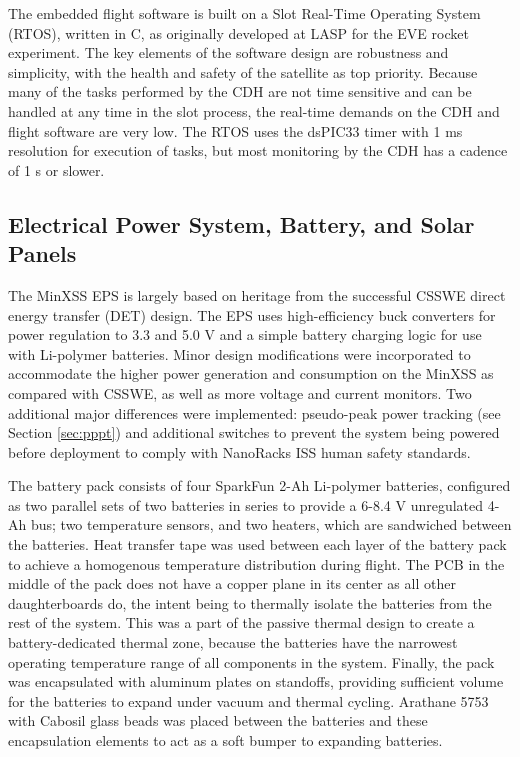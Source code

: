 The embedded flight software is built on a Slot Real-Time Operating System (RTOS), written in C, as originally developed at LASP for the EVE rocket experiment. The key elements of the software design are robustness and simplicity, with the health and safety of the satellite as top priority. Because many of the tasks performed by the CDH are not time sensitive and can be handled at any time in the slot process, the real-time demands on the CDH and flight software are very low. The RTOS uses the dsPIC33 timer with 1 ms resolution for execution of tasks, but most monitoring by the CDH has a cadence of 1 s or slower.

\subsection{Electrical Power System, Battery, and Solar Panels}
The MinXSS EPS is largely based on heritage from the successful CSSWE direct energy transfer (DET) design. The EPS uses high-efficiency buck converters for power regulation to 3.3 and 5.0 V and a simple battery charging logic for use with Li-polymer batteries. Minor design modifications were incorporated to accommodate the higher power generation and consumption on the MinXSS as compared with CSSWE, as well as more voltage and current monitors. Two additional major differences were implemented: pseudo-peak power tracking (see Section \ref{sec:pppt}) and additional switches to prevent the system being powered before deployment to comply with NanoRacks ISS human safety standards.

The battery pack consists of four SparkFun 2-Ah Li-polymer batteries, configured as two parallel sets of two batteries in series to provide a 6-8.4 V unregulated 4-Ah bus; two temperature sensors, and two heaters, which are sandwiched between the batteries. Heat transfer tape was used between each layer of the battery pack to achieve a homogenous temperature distribution during flight. The PCB in the middle of the pack does not have a copper plane in its center as all other daughterboards do, the intent being to thermally isolate the batteries from the rest of the system. This was a part of the passive thermal design to create a battery-dedicated thermal zone, because the batteries have the narrowest operating temperature range of all components in the system. Finally, the pack was encapsulated with aluminum plates on standoffs, providing sufficient volume for the batteries to expand under vacuum and thermal cycling. Arathane 5753 with Cabosil glass beads was placed between the batteries and these encapsulation elements to act as a soft bumper to expanding batteries.

